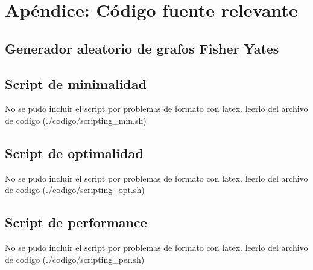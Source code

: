 \section{Ap\'endice: C\'odigo fuente relevante}

\subsection{Generador aleatorio de grafos Fisher Yates}


\subsection{Script de minimalidad}
No se pudo incluir el script por problemas de formato con latex. leerlo del archivo de codigo (./codigo/scripting\_min.sh)
%

\subsection{Script de optimalidad}
No se pudo incluir el script por problemas de formato con latex. leerlo del archivo de codigo (./codigo/scripting\_opt.sh)
%

\subsection{Script de performance}
No se pudo incluir el script por problemas de formato con latex. leerlo del archivo de codigo (./codigo/scripting\_per.sh)
%

